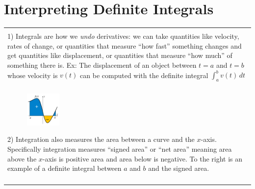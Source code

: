 \documentclass[12pt]{report}
\newenvironment{boxe}
    {\begin{center}
    \begin{tabular}{|p{0.9\textwidth}|}
    \hline\\
    }
    { 
    \\\\\hline
    \end{tabular} 
    \end{center}
    }
\begin{document}
\section*{Interpreting Definite Integrals}
\begin{boxe}
1) Integrals are how we \textit{undo} derivatives: we can take quantities like velocity, rates of change, or quantities that measure ``how fast'' something changes and get quantities like displacement, or 
quantities that measure ``how much'' of something there is. Ex: The displacement of an object between $t=a$ and $t=b$ whose velocity is $v(t)$ can be computed with the definite integral $\displaystyle{\int_{a}^{b}v(t)\,dt}$\\\\
\begin{figure}
    \centering
    \vspace*{-.9cm}\includegraphics[width=0.16\textwidth]{300px-Integral_example.svg.png}
\end{figure}

2) Integration also measures the area between a curve and the $x$-axis. Specifically integration measures ``signed area'' or ``net area'' meaning area above the $x$-axis is positive area and area below is negative. To the right is an example of a definite integral between $a$ and $b$ and the signed area.
\end{boxe}
\end{document}
